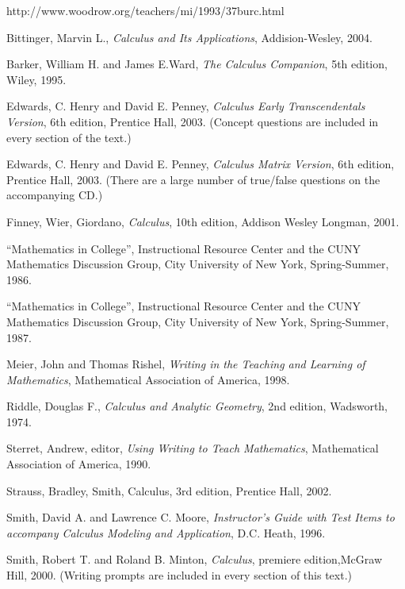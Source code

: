   \begin{thebibliography}{99}



       http://www.woodrow.org/teachers/mi/1993/37burc.html

      Bittinger, Marvin L., \emph{Calculus and Its Applications}, Addision-Wesley, 2004.

   Barker, William H. and James E.Ward, \emph{The Calculus Companion}, 5th edition, Wiley, 1995.

     Edwards, C. Henry and David E. Penney, \emph{Calculus Early Transcendentals Version}, 6th edition, Prentice Hall, 2003.  (Concept questions are included in every section of the text.)

	Edwards, C. Henry and David E. Penney, \emph{Calculus Matrix Version}, 6th edition, Prentice Hall, 2003.  (There are a large number of true/false questions on the accompanying CD.)

 Finney, Wier, Giordano, \emph{Calculus}, 10th edition, Addison Wesley Longman, 2001.

	``Mathematics in College'', Instructional Resource Center and the CUNY Mathematics Discussion Group, City University of New York,  Spring-Summer, 1986.

	``Mathematics in College'', Instructional Resource Center and the CUNY Mathematics Discussion Group, City University of New York,  Spring-Summer, 1987.

    Meier, John and Thomas Rishel, \emph{Writing in the Teaching and Learning of Mathematics}, Mathematical Association of America, 1998.

       Riddle, Douglas F., \emph{Calculus and Analytic Geometry}, 2nd edition, Wadsworth, 1974.

       Sterret, Andrew, editor, \emph{Using Writing to Teach Mathematics}, Mathematical Association of America, 1990.

   Strauss, Bradley, Smith, Calculus, 3rd edition, Prentice Hall, 2002.

  Smith, David A. and Lawrence C. Moore, \emph{Instructor's Guide with Test Items to accompany Calculus Modeling and Application}, D.C. Heath, 1996.

    Smith, Robert T. and Roland B. Minton, \emph{Calculus}, premiere edition,McGraw Hill, 2000. (Writing prompts are included in every section of this text.)


\end{thebibliography}
